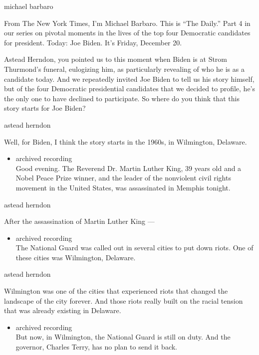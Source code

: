 michael barbaro

From The New York Times, I'm Michael Barbaro. This is ``The Daily.''
Part 4 in our series on pivotal moments in the lives of the top four
Democratic candidates for president. Today: Joe Biden. It's Friday,
December 20.

Astead Herndon, you pointed us to this moment when Biden is at Strom
Thurmond's funeral, eulogizing him, as particularly revealing of who he
is as a candidate today. And we repeatedly invited Joe Biden to tell us
his story himself, but of the four Democratic presidential candidates
that we decided to profile, he's the only one to have declined to
participate. So where do you think that this story starts for Joe Biden?

astead herndon

Well, for Biden, I think the story starts in the 1960s, in Wilmington,
Delaware.

\begin{itemize}
\tightlist
\item
  archived recording\\
  Good evening. The Reverend Dr. Martin Luther King, 39 years old and a
  Nobel Peace Prize winner, and the leader of the nonviolent civil
  rights movement in the United States, was assassinated in Memphis
  tonight.
\end{itemize}

astead herndon

After the assassination of Martin Luther King ---

\begin{itemize}
\tightlist
\item
  archived recording\\
  The National Guard was called out in several cities to put down riots.
  One of these cities was Wilmington, Delaware.
\end{itemize}

astead herndon

Wilmington was one of the cities that experienced riots that changed the
landscape of the city forever. And those riots really built on the
racial tension that was already existing in Delaware.

\begin{itemize}
\tightlist
\item
  archived recording\\
  But now, in Wilmington, the National Guard is still on duty. And the
  governor, Charles Terry, has no plan to send it back.
\end{itemize}

